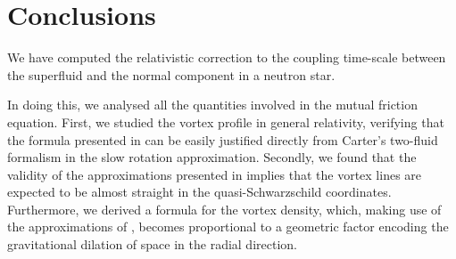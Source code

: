 \documentclass[usenatbib%
]{mnras}
\begin{document}
%
%
%
%
%






\section{Conclusions}\label{sec:conclusions}

We have computed the relativistic correction to the coupling time-scale between the superfluid and the normal component in a neutron star.

In doing this, we analysed all the quantities involved in the mutual friction equation. First, we studied the vortex profile in general relativity, verifying that the formula presented in \cite{Rothen1981} can be easily justified directly from Carter's two-fluid formalism in the slow rotation approximation. 
Secondly, we found that the validity of the approximations presented in \cite{Ravenhall_Pethick1994} implies that the vortex lines are expected to be almost straight in the quasi-Schwarzschild coordinates. 
Furthermore, we derived a formula for the vortex density, which, making use of the approximations of \cite{Ravenhall_Pethick1994}, becomes proportional to a geometric factor encoding the gravitational dilation of space in the radial direction. 
\end{document}
